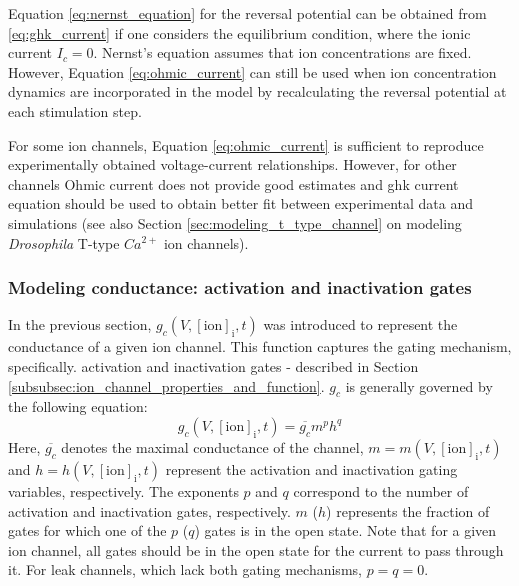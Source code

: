 \documentclass[../main.tex]{subfiles}
\begin{document}
Equation \ref{eq:nernst_equation} for the reversal potential can be obtained from \ref{eq:ghk_current} if one considers
the equilibrium condition, where the ionic current $I_c=0$. Nernst's equation assumes that ion concentrations
are fixed. However, Equation \ref{eq:ohmic_current} can still be used when ion concentration dynamics
are incorporated in the model by recalculating the reversal potential at each stimulation step.

For some ion channels, Equation \ref{eq:ohmic_current} is sufficient to reproduce experimentally obtained
voltage-current relationships. However, for other channels Ohmic current does not provide good
estimates and \gls{ghk} current equation should be used to obtain better fit between
experimental data and simulations \parencite{huguenardSimulationCurrentsInvolved1992} (see also Section \ref{sec:modeling_t_type_channel} on modeling \textit{Drosophila} T-type $Ca^{2+}$ ion channels).

\subsubsection{Modeling conductance: activation and inactivation gates} \label{subsubsec:modeling_conductance}

In the previous section, $g_c(V,[\text{ion}]_{\text{i}},t)$ was introduced to represent the conductance of a given ion channel. This function captures the gating mechanism, specifically. activation and inactivation gates - described in Section \ref{subsubsec:ion_channel_properties_and_function}. $g_c$ is generally governed by the following equation:
\begin{equation} \label{eq:conductance_wrt_gating_variables}
    g_c(V,[\text{ion}]_{\text{i}},t) = \overline{g_c} m^p h^q
\end{equation}
Here, $\overline{g_c}$ denotes the maximal conductance of the channel,
$m=m(V,[\text{ion}]_{\text{i}},t)$ and $h=h(V,[\text{ion}]_{\text{i}},t)$ represent the activation and inactivation gating variables, respectively. The exponents $p$ and $q$ correspond to the number of activation and inactivation gates, respectively. $m$ ($h$) represents the fraction of gates for which one of the $p$ ($q$) gates is in the open state. Note that for a given ion channel, all gates should be in the open state for the current to pass through it. For leak channels, which lack both gating mechanisms, $p=q=0$. 
\end{document}
